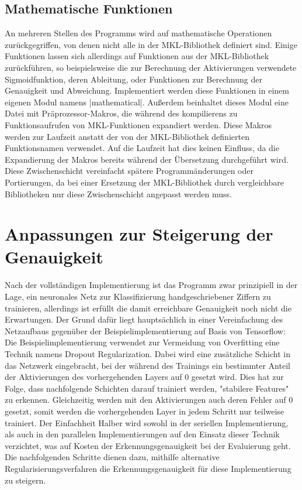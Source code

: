 \documentclass[../main.tex]{subfiles}
\begin{document}
\subsection{Mathematische Funktionen}
An mehreren Stellen des Programms wird auf mathematische Operationen zurückgegriffen, von denen nicht alle in der MKL-Bibliothek definiert sind. Einige Funktionen lassen sich allerdings auf Funktionen aus der MKL-Bibliothek zurückführen, so beispielsweise die zur Berechnung der Aktivierungen verwendete Sigmoidfunktion, deren Ableitung, oder Funktionen zur Berechnung der Genauigkeit und Abweichung. Implementiert werden diese Funktionen in einem eigenen Modul namens |mathematical|. Außerdem beinhaltet dieses Modul eine Datei mit Präprozessor-Makros, die während des kompilierens zu Funktionsaufrufen von MKL-Funktionen expandiert werden. Diese Makros werden zur Laufzeit anstatt der von der MKL-Bibliothek definierten Funktionsnamen verwendet. Auf die Laufzeit hat dies keinen Einfluss, da die Expandierung der Makros bereits während der Übersetzung durchgeführt wird. Diese Zwischenschicht vereinfacht spätere Programmänderungen oder Portierungen, da bei einer Ersetzung der MKL-Bibliothek durch vergleichbare Bibliotheken nur diese Zwischenschicht angepasst werden muss. 

\section{Anpassungen zur Steigerung der Genauigkeit}
Nach der vollständigen Implementierung ist das Programm zwar prinzipiell in der Lage, ein neuronales Netz zur Klassifizierung handgeschriebener Ziffern zu trainieren, allerdings ist erfüllt die damit erreichbare Genauigkeit noch nicht die Erwartungen. Der Grund dafür liegt hauptsächlich in einer Vereinfachung des Netzaufbaus gegenüber der Beispielimplementierung auf Basis von Tensorflow: Die Beispielimplementierung verwendet zur Vermeidung von Overfitting eine Technik namens Dropout Regularization. Dabei wird eine zusätzliche Schicht in das Netzwerk eingebracht, bei der während des Trainings ein bestimmter Anteil der Aktivierungen des vorhergehenden Layers auf \(0\) gesetzt wird. Dies hat zur Folge, dass nachfolgende Schichten darauf trainiert werden, "stabilere Features" zu erkennen. Gleichzeitig werden mit den Aktivierungen auch deren Fehler auf \(0\) gesetzt, somit werden die vorhergehenden Layer in jedem Schritt nur teilweise trainiert. Der Einfachheit Halber wird sowohl in der seriellen Implementierung, als auch in den parallelen Implementierungen auf den Einsatz dieser Technik verzichtet, was auf Kosten der Erkennungsgenauigkeit bei der Evaluierung geht. Die nachfolgenden Schritte dienen dazu, mithilfe alternative Regularisierungsverfahren die Erkennungsgenauigkeit für diese Implementierung zu steigern. 
\end{document}
